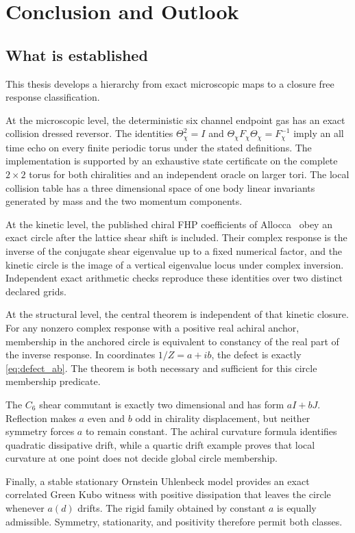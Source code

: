 \chapter{Conclusion and Outlook}\label{ch:conclusion}

\section{What is established}
This thesis develops a hierarchy from exact microscopic maps to a closure free response classification.

At the microscopic level, the deterministic six channel endpoint gas has an exact collision dressed reversor. The identities $\Theta_\chi^2=I$ and $\Theta_\chi F_\chi\Theta_\chi=F_\chi^{-1}$ imply an all time echo on every finite periodic torus under the stated definitions. The implementation is supported by an exhaustive \HXGlobalStates{} state certificate on the complete $2\times2$ torus for both chiralities and an independent oracle on larger tori. The local collision table has a three dimensional space of one body linear invariants generated by mass and the two momentum components.

At the kinetic level, the published chiral FHP coefficients of Allocca \etal\ obey an exact circle after the lattice shear shift is included. Their complex response is the inverse of the conjugate shear eigenvalue up to a fixed numerical factor, and the kinetic circle is the image of a vertical eigenvalue locus under complex inversion. Independent exact arithmetic checks reproduce these identities over two distinct declared grids.

At the structural level, the central theorem is independent of that kinetic closure. For any nonzero complex response with a positive real achiral anchor, membership in the anchored circle is equivalent to constancy of the real part of the inverse response. In coordinates $1/Z=a+ib$, the defect is exactly \cref{eq:defect_ab}. The theorem is both necessary and sufficient for this circle membership predicate.

The $C_6$ shear commutant is exactly two dimensional and has form $aI+bJ$. Reflection makes $a$ even and $b$ odd in chirality displacement, but neither symmetry forces $a$ to remain constant. The achiral curvature formula identifies quadratic dissipative drift, while a quartic drift example proves that local curvature at one point does not decide global circle membership.

Finally, a stable stationary Ornstein Uhlenbeck model provides an exact correlated Green Kubo witness with positive dissipation that leaves the circle whenever $a(d)$ drifts. The rigid family obtained by constant $a$ is equally admissible. Symmetry, stationarity, and positivity therefore permit both classes.

